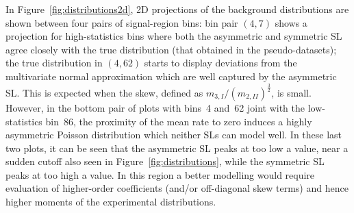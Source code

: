 \documentclass[11pt]{article}
\begin{document}
In Figure~\ref{fig:distributions2d}, 2D projections of the background
distributions are shown between four pairs of signal-region bins: bin pair
$(4,7)$ shows a projection for high-statistics bins where both the asymmetric and symmetric  SL agree closely with the true distribution (that obtained in the pseudo-datasets);
the true distribution in $(4,62)$ starts to display deviations from the multivariate
normal approximation which are well captured by the asymmetric SL. This is
expected when the skew, defined as $m_{3,I}/(m_{2,II})^{\frac{3}{2}}$, is small.
However, in the bottom pair of plots with bins~4 and~62 joint with the low-statistics
bin~86, the proximity of the mean rate to zero induces a highly asymmetric
Poisson distribution which neither SLs can model well. In these last
two plots, it can be seen that the asymmetric SL peaks at too low a value,
near a sudden cutoff also seen in Figure~\ref{fig:distributions}, while the
symmetric SL peaks at too high a value. 
In this region a better modelling would  require
evaluation of higher-order coefficients (and/or off-diagonal skew terms) and
hence higher moments of the experimental distributions.
\end{document}
